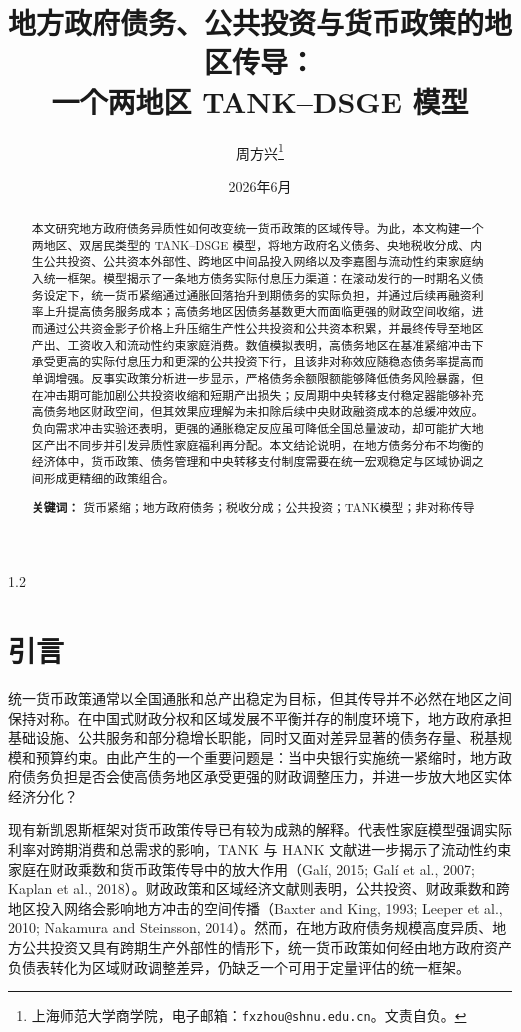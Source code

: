 \documentclass[12pt,UTF8]{ctexart}
\title{\textbf{地方政府债务、公共投资与货币政策的地区传导：\\一个两地区 TANK--DSGE 模型}}
\author{\quad 周方兴\thanks{上海师范大学商学院，电子邮箱：\texttt{fxzhou@shnu.edu.cn}。文责自负。} }
\date{2026年6月}
\begin{document}
	\maketitle
	\begin{spacing}{1.2}
		
		\begin{abstract}
			本文研究地方政府债务异质性如何改变统一货币政策的区域传导。为此，本文构建一个两地区、双居民类型的 TANK--DSGE 模型，将地方政府名义债务、央地税收分成、内生公共投资、公共资本外部性、跨地区中间品投入网络以及李嘉图与流动性约束家庭纳入统一框架。模型揭示了一条地方债务实际付息压力渠道：在滚动发行的一时期名义债务设定下，统一货币紧缩通过通胀回落抬升到期债务的实际负担，并通过后续再融资利率上升提高债务服务成本；高债务地区因债务基数更大而面临更强的财政空间收缩，进而通过公共资金影子价格上升压缩生产性公共投资和公共资本积累，并最终传导至地区产出、工资收入和流动性约束家庭消费。数值模拟表明，高债务地区在基准紧缩冲击下承受更高的实际付息压力和更深的公共投资下行，且该非对称效应随稳态债务率提高而单调增强。反事实政策分析进一步显示，严格债务余额限额能够降低债务风险暴露，但在冲击期可能加剧公共投资收缩和短期产出损失；反周期中央转移支付稳定器能够补充高债务地区财政空间，但其效果应理解为未扣除后续中央财政融资成本的总缓冲效应。负向需求冲击实验还表明，更强的通胀稳定反应虽可降低全国总量波动，却可能扩大地区产出不同步并引发异质性家庭福利再分配。本文结论说明，在地方债务分布不均衡的经济体中，货币政策、债务管理和中央转移支付制度需要在统一宏观稳定与区域协调之间形成更精细的政策组合。
			
			\vspace{0.3cm}
			\noindent\textbf{关键词：} 货币紧缩；地方政府债务；税收分成；公共投资；TANK模型；非对称传导
		\end{abstract}
		
		\newpage
		
		\section{引言}
		
		统一货币政策通常以全国通胀和总产出稳定为目标，但其传导并不必然在地区之间保持对称。在中国式财政分权和区域发展不平衡并存的制度环境下，地方政府承担基础设施、公共服务和部分稳增长职能，同时又面对差异显著的债务存量、税基规模和预算约束。由此产生的一个重要问题是：当中央银行实施统一紧缩时，地方政府债务负担是否会使高债务地区承受更强的财政调整压力，并进一步放大地区实体经济分化？
		
		现有新凯恩斯框架对货币政策传导已有较为成熟的解释。代表性家庭模型强调实际利率对跨期消费和总需求的影响，TANK 与 HANK 文献进一步揭示了流动性约束家庭在财政乘数和货币政策传导中的放大作用（Galí, 2015; Galí et al., 2007; Kaplan et al., 2018）。财政政策和区域经济文献则表明，公共投资、财政乘数和跨地区投入网络会影响地方冲击的空间传播（Baxter and King, 1993; Leeper et al., 2010; Nakamura and Steinsson, 2014）。然而，在地方政府债务规模高度异质、地方公共投资又具有跨期生产外部性的情形下，统一货币政策如何经由地方政府资产负债表转化为区域财政调整差异，仍缺乏一个可用于定量评估的统一框架。
		

\end{spacing}
\end{document}
